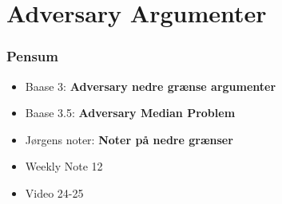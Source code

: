 \section{Adversary Argumenter}%
\label{sec:adversaryargumenter}

\begin{frame}
	\frametitle{Pensum}
	\begin{itemize}
		\item Baase 3: \textbf{Adversary nedre grænse argumenter}
		\item Baase 3.5: \textbf{Adversary Median Problem}
		\item Jørgens noter: \textbf{Noter på nedre grænser}
		\item Weekly Note 12
		\item Video 24-25
	\end{itemize}
\end{frame}

